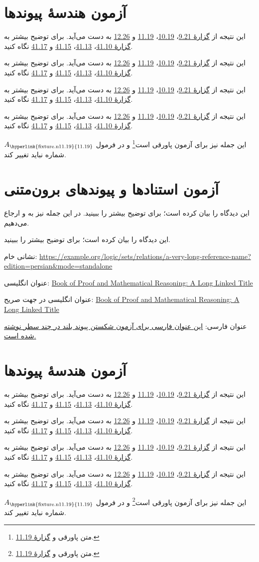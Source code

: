 \documentclass[14pt,oneside,openany]{memoir}
\newcommand{\GRef}[1]{\hyperlink{fixture.n#1}{#1}}
\newcommand{\GNamedRef}[1]{\hyperlink{fixture.n#1}{گزارهٔ #1}}
\newcommand{\GList}{\GNamedRef{9.21}، \GRef{10.19}، \GRef{11.19} و \GRef{12.26}}
\newcommand{\GSample}[1]{%
  \par\noindent\begin{minipage}{#1}\raggedleft
  این نتیجه از \GList{} به دست می‌آید. برای توضیح بیشتر به \GNamedRef{41.10}،
  \GRef{41.13}، \GRef{41.15} و \GRef{41.17} نگاه کنید.
  \end{minipage}\par\medskip}
\begin{document}
\begingroup
{}

\chapter*{آزمون هندسهٔ پیوندها}
\noindent{}\par
\GSample{468pt}\GSample{350pt}\GSample{260pt}\GSample{190pt}
\noindent این جمله نیز برای آزمون پاورقی است\footnote{متن پاورقی و \GNamedRef{11.19}.}
و در فرمول \(A_{\text{\GRef{11.19}}}\) شماره نباید تغییر کند.
\newpage
\chapter*{آزمون استنادها و پیوندهای برون‌متنی}
\noindent\begin{minipage}{468pt}\raggedleft
این دیدگاه را \citet{Cantor1892} بیان کرده است؛ برای توضیح بیشتر
\citep{Frege1884,Benacerraf1965,Magnus2021} را ببینید.
در این جمله نیز به \citet{Solow2013} و \citet{Hammack2013} ارجاع می‌دهیم.
\end{minipage}\par\medskip
\noindent\begin{minipage}{190pt}\raggedleft
این دیدگاه را \citet{Cantor1892} بیان کرده است؛ برای توضیح بیشتر
\citep{Frege1884,Benacerraf1965,Magnus2021} را ببینید.
\end{minipage}\par\bigskip
\noindent\begin{minipage}{260pt}\raggedleft
نشانی خام:
\url{https://example.org/logic/sets/relations/a-very-long-reference-name?edition=persian&mode=standalone}
\par عنوان انگلیسی:
\href{https://example.org/book-of-proof}{Book of Proof and Mathematical Reasoning: A Long Linked Title}
\par عنوان انگلیسی در جهت صریح:
\foreignlanguage{english}{\href{https://example.org/explicit-ltr-title}{Book of Proof and Mathematical Reasoning: A Long Linked Title}}
\par عنوان فارسی:
\href{https://example.org/persian-title}{این عنوان فارسی برای آزمون شکستن پیوند بلند در چند سطر نوشته شده است.}
\end{minipage}
\newpage
\endgroup
\begingroup
{}

\chapter*{آزمون هندسهٔ پیوندها}
\noindent{}\par
\GSample{468pt}\GSample{350pt}\GSample{260pt}\GSample{190pt}
\noindent این جمله نیز برای آزمون پاورقی است\footnote{متن پاورقی و \GNamedRef{11.19}.}
و در فرمول \(A_{\text{\GRef{11.19}}}\) شماره نباید تغییر کند.
\newpage
\end{document}
